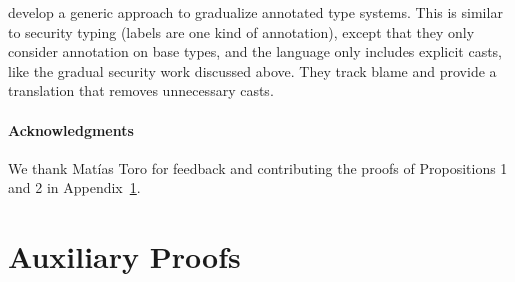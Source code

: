 \documentclass[authoryear,sort&compress,9pt,twocolumn,nocopyrightspace]{sigplanconf}
\newcommand{\?}{\textsf{\upshape ?}} \newcommand{\consistent}[1]{\widetilde{#1}}
\begin{document}
\citet{thiemannFennell:esop2014} develop a generic approach to gradualize
annotated type systems. This is similar to security typing (labels are one kind
of annotation), except that they only consider annotation on base types, and
the language only includes explicit casts, like the gradual security work
discussed above.  They track blame and provide a translation that removes
unnecessary casts.


\paragraph{Acknowledgments} We thank Mat{\'i}as Toro for feedback and contributing
the proofs of Propositions 1 and 2 in Appendix~\ref{sec:auxiliary-proofs}.  




{}


\appendix

\section{Auxiliary Proofs}
\label{sec:auxiliary-proofs}
\end{document}
